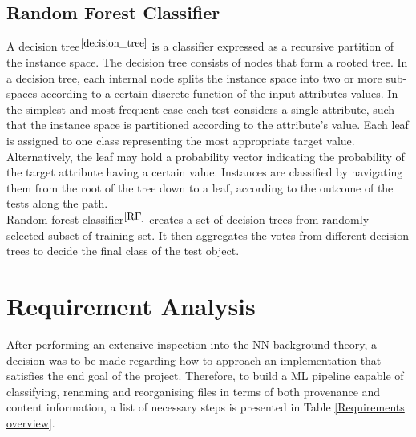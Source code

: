 \subsection{Random Forest Classifier}

A decision tree$^{\small \cite{decision_tree}}$ is a classifier expressed as a recursive partition of the instance space. The decision tree consists of nodes that form a rooted tree. In a decision tree, each internal node splits the instance space into two or more sub-spaces according to a certain discrete function of the input attributes values. In the simplest and most frequent case each test considers a single attribute, such that the instance space is partitioned according to the attribute’s value. Each leaf is assigned to one class representing the most appropriate target value. Alternatively, the leaf may hold a probability vector indicating the probability of the target attribute having a certain value. Instances are classified by navigating them from the root of the tree down to a leaf, according to the outcome of the tests along the path. \\

Random forest classifier$^{\small \cite{RF}}$ creates a set of decision trees from randomly selected subset of training set. It then aggregates the votes from different decision trees to decide the final class of the test object. \\

\section{Requirement Analysis} \label{Requirement Analysis}

After performing an extensive inspection into the NN background theory, a decision was to be made regarding how to approach an implementation that satisfies the end goal of the project. Therefore, to build a ML pipeline capable of classifying, renaming and reorganising files in terms of both provenance and content information, a list of necessary steps is presented in Table \ref{Requirements overview}. \bigskip

